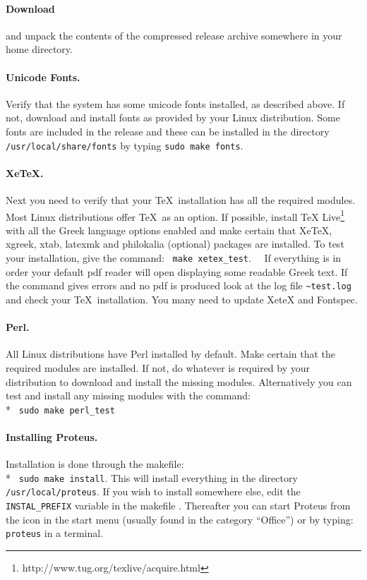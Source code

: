 \documentclass[11pt,a4paper]{article}
\begin{document}
    \paragraph{Download} and unpack the contents of the compressed release
    archive somewhere in your home directory.
    \paragraph{Unicode Fonts.}
      Verify that the system has some unicode fonts installed, as described above.
      If not, download and install fonts as provided by your Linux distribution.
      Some fonts are included in the release and these can be installed in the directory
      {\tt /usr/local/share/fonts} by typing  {\tt sudo make fonts}.
    \paragraph{XeTeX.}
      Next you need to verify that your \TeX\ installation has all the required modules.
      Most Linux distributions offer \TeX\ as an option. If possible, install
      TeX Live\footnote{http://www.tug.org/texlive/acquire.html} with all the
      Greek language options enabled and make certain that XeTeX, xgreek, xtab, latexmk
      and philokalia (optional) packages are installed.
      To test your installation, give the command:~ {\tt make xetex\_test}.~~
      If everything is in order your default pdf reader will open displaying
      some readable Greek text.  If the command gives errors and no pdf is produced
      look at the log file {\tt \~{}test.log}  and check your
      \TeX\ installation. You many need to update XeteX and Fontspec.
    \paragraph{Perl.}
      All Linux distributions have Perl installed by default.  Make certain that
      the required modules are installed. If not, do whatever is required
      by your distribution to download and install the missing modules.
      Alternatively you can test and install any missing modules with the
      command:\\*  {\tt \hspace*{2cm} sudo make perl\_test}
      \paragraph{Installing Proteus.}
      Installation is done through the makefile:\\*
      {\tt \hspace*{2cm} sudo make install}.\newline
      This will install everything in the directory {\tt /usr/local/proteus}.
      If you wish to install somewhere else, edit the {\tt INSTAL\_PREFIX}
      variable in the makefile .
      Thereafter you can start Proteus from the icon in the start menu
      (usually found in the category ``Office'') or by typing:~ {\tt proteus}
      in a terminal.
\end{document}
